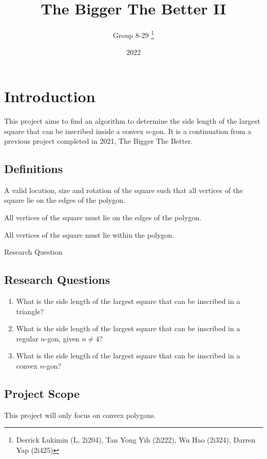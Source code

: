 \documentclass[12pt]{scrartcl}
\title{The Bigger The Better II}
\author{Group 8-29 \thanks{Derrick Lukimin (L, 2i204), Tan Yong Yih (2i222), Wu Hao (2i324), Darren Yap (2i425)}}
\date{2022}
\begin{document}
\onehalfspacing
\maketitle
\tableofcontents

\section{Introduction}
This project aims to find an algorithm to determine
the side length of the largest square that can be
inscribed inside a convex $n$-gon. It is a continuation from
a previous project completed in 2021, The Bigger The Better. \cite{tbtb1}

\subsection{Definitions}
\begin{description}[font=\bfseries, leftmargin=1cm, style=nextline]
	\item[placement] A valid location, size and rotation of the square such that
		all vertices of the square lie on the edges of the polygon.
	\item[inscribed] All vertices of the square must lie on the edges of the polygon.
	\item[fit] All vertices of the square must lie within the polygon.
	\item[RQ] Research Question
\end{description}

\subsection{Research Questions}
\begin{enumerate}
	\item What is the side length of the largest square that can be inscribed in a triangle?
	\item What is the side length of the largest square that can be inscribed in a regular $n$-gon, given $n \neq 4$?
	\item What is the side length of the largest square that can be inscribed in a convex $n$-gon?
\end{enumerate}

\subsection{Project Scope}
This project will only focus on convex polygons.
\end{document}
